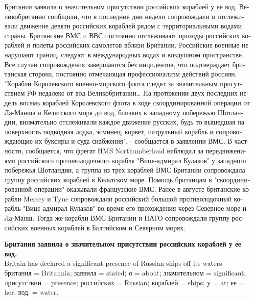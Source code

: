 

\setmainlanguage{russian}




\begin{russian}
Британия заявила о значительном присутствии российских кораблей у ее вод. Великобритании сообщили, что в последние дни недели сопровождали и отслеживали движение девяти российских кораблей рядом с территориальными водами страны. Британские ВМС и ВВС постоянно отслеживают проходы российских кораблей и полеты российских самолетов вблизи Британии. Российские военные не нарушают границ, следуют в международных водах и воздушном пространстве. Все случаи сопровождения завершаются без инцидентов, что подтверждает британская сторона, постоянно отмечающая профессионализм действий россиян. "Корабли Королевского военно-морского флота следят за значительным присутствием РФ недалеко от вод Великобритании… На протяжении двух последних недель восемь кораблей Королевского флота в ходе скоординированной операции от Ла-Манша и Кельтского моря до вод, близких к западному побережью Шотландии, внимательно отслеживали каждое движение русских, будь то вышедшая на поверхность подводная лодка, эсминец, корвет, патрульный корабль и сопровождающие их буксиры и суда снабжения", - сообщается в заявлении ВМС. В частности, сообщается, что фрегат HMS Northumberland наблюдал за передвижениями российского противолодочного корабля "Вице-адмирал Кулаков" у западного побережья Шотландии, а группа из трех кораблей ВМС Британии сопровождала группу российских кораблей в Кельтском море. Помощь британцам в "скоординированной операции" оказывали французские ВМС. Ранее в августе британские корабли Mersey и Tyne сопровождали российский большой противолодочный корабль "Вице-адмирал Кулаков" во время его прохождения через Северное море и Ла-Манш. Тогда же корабли ВМС Британии и НАТО сопровождали группу российских военных кораблей в Балтийском и Северном морях.
\end{russian}

{\bf Британия заявила о значительном присутствии российских кораблей у ее вод. }\\
Britain has declared a significant presence of Russian ships off its waters.\\
{\color{darkgreen} британия = Britannia; заявила = stated; о = about; значительном = significant; присутствии = presence; российских = Russian; кораблей = ships; у = at; ее = her; вод. = water.}

